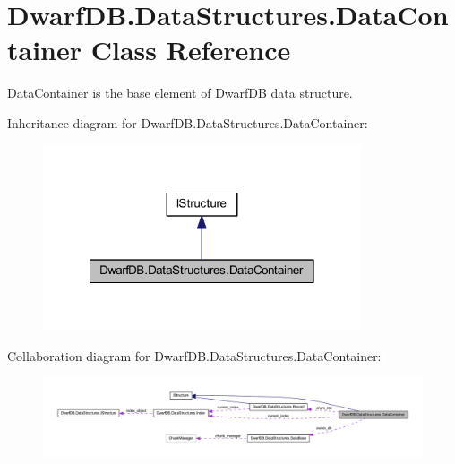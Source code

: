 \hypertarget{class_dwarf_d_b_1_1_data_structures_1_1_data_container}{
\section{DwarfDB.DataStructures.DataContainer Class Reference}
\label{class_dwarf_d_b_1_1_data_structures_1_1_data_container}
}


\hyperlink{class_dwarf_d_b_1_1_data_structures_1_1_data_container}{DataContainer} is the base element of DwarfDB data structure.  




Inheritance diagram for DwarfDB.DataStructures.DataContainer:\nopagebreak
\begin{figure}[H]
\begin{center}
\leavevmode
\includegraphics[width=266pt]{class_dwarf_d_b_1_1_data_structures_1_1_data_container__inherit__graph}
\end{center}
\end{figure}


Collaboration diagram for DwarfDB.DataStructures.DataContainer:
\nopagebreak
\begin{figure}[H]
\begin{center}
\leavevmode
\includegraphics[width=400pt]{class_dwarf_d_b_1_1_data_structures_1_1_data_container__coll__graph}
\end{center}
\end{figure}
